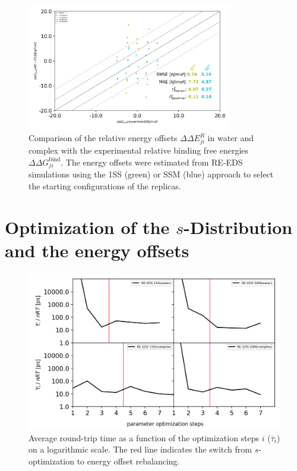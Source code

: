 \begin{figure}[H]
\centering
  \includegraphics[width=0.8\textwidth]{fig/results/ringOpening/paramOptimization/RingClosure_system_Eoff_final_results.png}
\caption{Comparison of the relative energy offsets $\Delta \Delta E^R_{ji}$ in water and complex with the experimental relative binding free energies $\Delta \Delta G^\text{bind}_{ji}$. The energy offsets were estimated from RE-EDS simulations using the 1SS (green) or SSM (blue) approach to select the starting configurations of the replicas.} \label{SIfig:Eoff_experiment_corr_RingOpening}
\end{figure}

\newpage
\section{Optimization of the $s$-Distribution and the energy offsets}
\begin{figure}[h]
\centering
\includegraphics[width=\linewidth]{fig/results/ringOpening/paramOptimization/RingOpening_optimization_RTstat.png}
\caption{Average round-trip time as a function of the optimization steps $i$ ($\overline{\tau}_i$) on a logarithmic scale. The red line indicates the switch from $s$-optimization to energy offset rebalancing.}
\label{SIfig:CHK1_RingOpening_soptimization_efficiency}
\end{figure}

